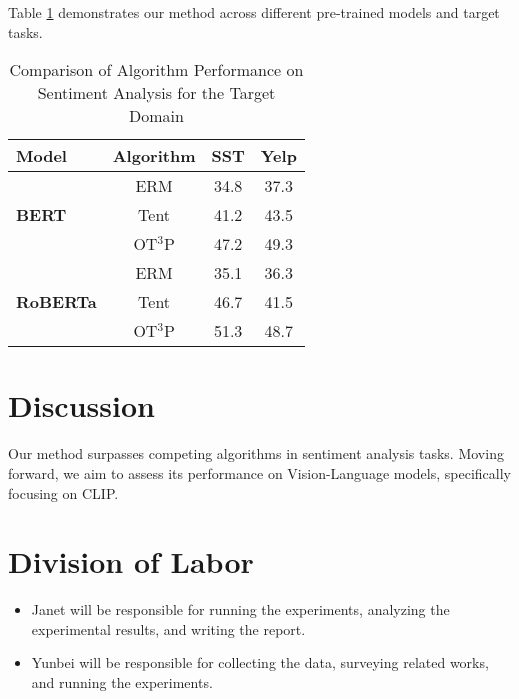 \documentclass[11pt,a4paper]{article}
\begin{document}
Table \ref{tab:main} demonstrates our method across different pre-trained models and target tasks.

\begin{table}[ht]
\centering

\begin{tabular}{lccc}
\hline
\textbf{Model} & \textbf{Algorithm} & \textbf{SST} & \textbf{Yelp} \\
\hline
\multirow{3}{*}{\textbf{BERT}} & ERM & 34.8 & 37.3 \\
& Tent & 41.2 & 43.5 \\
& OT$^3$P & 47.2 & 49.3 \\
\hline

\multirow{3}{*}{\textbf{RoBERTa}} & ERM & 35.1 & 36.3 \\
& Tent & 46.7 & 41.5 \\
& OT$^3$P & 51.3 & 48.7 \\
\hline

\end{tabular}
\caption{\label{tab:a_table} Comparison of Algorithm Performance on Sentiment Analysis for the Target Domain}
\label{tab:main}
\end{table}

\section{Discussion}

Our method surpasses competing algorithms in sentiment analysis tasks. 
Moving forward, we aim to assess its performance on Vision-Language models, specifically focusing on CLIP\cite{radford2021learning}. 

\section{Division of Labor}
\begin{itemize}
    \item Janet will be responsible for running the experiments, analyzing the experimental results, and writing the report. 
    \item Yunbei will be responsible for collecting the data, surveying related works, and running the experiments.
\end{itemize}






\end{document}
